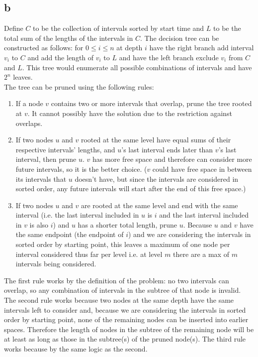 \documentclass[letterpaper,notitlepage,twoside]{article}
\begin{document}
\subsection*{b}
Define $C$ to be the collection of intervals sorted by start time and $L$ to be the total sum of the lengths of the intervals in $C$. 
The decision tree can be constructed as follows: for $0 \leq i \leq n$ at depth $i$ have the right branch add interval $v_i$ to $C$ and add the length of $v_i$ to $L$ and have the left branch exclude $v_i$ from $C$ and $L$. This tree would enumerate all possible combinations of intervals and have $2^n$ leaves. \\
The tree can be pruned using the following rules:
\begin{enumerate}
\item If a node $v$ contains two or more intervals that overlap, prune the tree rooted at $v$. It cannot possibly have the solution due to the restriction against overlaps.
\item If two nodes $u$ and $v$ rooted at the same level have equal sums of their respective intervals' lengths, and $u$'s last interval ends later than $v$'s last interval, then prune $u$. $v$ has more free space and therefore can consider more future intervals, so it is the better choice. ($v$ could have free space in between its intervals that $u$ doesn't have, but since the intervals are considered in sorted order, any future intervals will start after the end of this free space.) 
\item If two nodes $u$ and $v$ are rooted at the same level and end with the same interval (i.e. the last interval included in $u$ is $i$ and the last interval included in $v$ is also $i$) and $u$ has a shorter total length, prune $u$. Because $u$ and $v$ have the same endpoint (the endpoint of $i$) and we are considering the intervals in sorted order by starting point, this leaves a maximum of one node per interval considered thus far per level i.e. at level $m$ there are a max of $m$ intervals being considered. 
\end{enumerate}
The first rule works by the definition of the problem: no two intervals can overlap, so any combination of intervals in the subtree of that node is invalid. The second rule works because two nodes at the same depth have the same intervals left to consider and, because we are considering the intervals in sorted order by starting point, none of the remaining nodes can be inserted into earlier spaces. Therefore the length of nodes in the subtree of the remaining node will be at least as long as those in the subtree(s) of the pruned node(s). The third rule works because by the same logic as the second. \\
\end{document}
